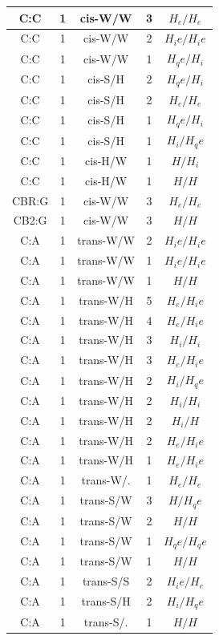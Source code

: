 \begin{center}
\begin{longtable}{c|c|c|c|c}
C:C & 1 & cis-W/W & 3 & $H_e/H_e$ \\  \hline
C:C & 1 & cis-W/W & 2 & $H_ie/H_ie$ \\  \hline
C:C & 1 & cis-W/W & 1 & $H_qe/H_i$ \\  \hline
C:C & 1 & cis-S/H & 2 & $H_qe/H_i$ \\  \hline
C:C & 1 & cis-S/H & 2 & $H_e/H_e$ \\  \hline
C:C & 1 & cis-S/H & 1 & $H_qe/H_i$ \\  \hline
C:C & 1 & cis-S/H & 1 & $H_i/H_qe$ \\  \hline
C:C & 1 & cis-H/W & 1 & $H/H_i$ \\  \hline
C:C & 1 & cis-H/W & 1 & $H/H$ \\  \hline
CBR:G & 1 & cis-W/W & 3 & $H_e/H_e$ \\  \hline
CB2:G & 1 & cis-W/W & 3 & $H/H$ \\  \hline
C:A & 1 & trans-W/W & 2 & $H_ie/H_ie$ \\  \hline
C:A & 1 & trans-W/W & 1 & $H_ie/H_ie$ \\  \hline
C:A & 1 & trans-W/W & 1 & $H/H$ \\  \hline
C:A & 1 & trans-W/H & 5 & $H_e/H_ie$ \\  \hline
C:A & 1 & trans-W/H & 4 & $H_e/H_ie$ \\  \hline
C:A & 1 & trans-W/H & 3 & $H_i/H_i$ \\  \hline
C:A & 1 & trans-W/H & 3 & $H_e/H_ie$ \\  \hline
C:A & 1 & trans-W/H & 2 & $H_i/H_qe$ \\  \hline
C:A & 1 & trans-W/H & 2 & $H_i/H_i$ \\  \hline
C:A & 1 & trans-W/H & 2 & $H_i/H$ \\  \hline
C:A & 1 & trans-W/H & 2 & $H_e/H_ie$ \\  \hline
C:A & 1 & trans-W/H & 1 & $H_e/H_ie$ \\  \hline
C:A & 1 & trans-W/. & 1 & $H_e/H_e$ \\  \hline
C:A & 1 & trans-S/W & 3 & $H/H_qe$ \\  \hline
C:A & 1 & trans-S/W & 2 & $H/H$ \\  \hline
C:A & 1 & trans-S/W & 1 & $H_qe/H_qe$ \\  \hline
C:A & 1 & trans-S/W & 1 & $H/H$ \\  \hline
C:A & 1 & trans-S/S & 2 & $H_ie/H_e$ \\  \hline
C:A & 1 & trans-S/H & 2 & $H_i/H_qe$ \\  \hline
C:A & 1 & trans-S/. & 1 & $H/H$ \\  \hline

\end{longtable}
\end{center}
